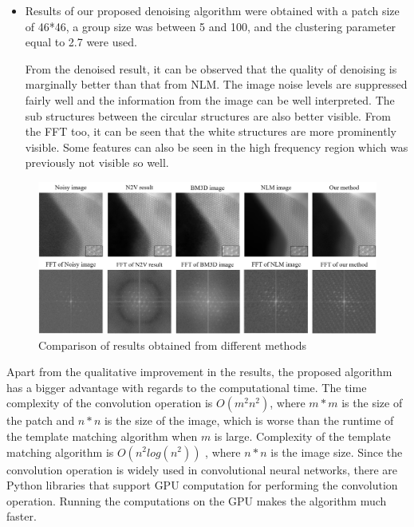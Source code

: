\documentclass[fleqn,10pt]{wlscirep}
\begin{document}
\begin{itemize}
		\item Results of our proposed denoising algorithm were obtained with a patch size of 46*46, a group size was between 5 and 100, and the clustering parameter equal to 2.7 were used. 
		
		From the denoised result, it can be observed that the quality of denoising is marginally better than that from NLM. The image noise levels are suppressed fairly well and the information from the image can be well interpreted. The sub structures between the circular structures are also better visible. From the FFT too, it can be seen that the white structures are more prominently visible. Some features can also be seen in the high frequency region which was previously not visible so well.
	\end{itemize}

	\begin{figure}
		\centering
		\includegraphics[scale=0.425]{./imgs/comparison.jpg}
		\caption{Comparison of results obtained from different methods}
		\label{fig:comparison}
	\end{figure}

	
	Apart from the qualitative improvement in the results, the proposed algorithm has a bigger advantage with regards to the computational time. The time complexity of the convolution operation is $O(m^2n^2)$, where $m*m$ is the size of the patch and $n*n$ is the size of the image, which is worse than the runtime of the template matching algorithm when $m$ is large. Complexity of the template matching algorithm is $O(n^2log(n^2))$ \cite{template_matching}, where $n*n$ is the image size. Since the convolution operation is widely used in convolutional neural networks, there are Python libraries that support GPU computation for performing the convolution operation. Running the computations on the GPU makes the algorithm much faster.
	
\end{document}
